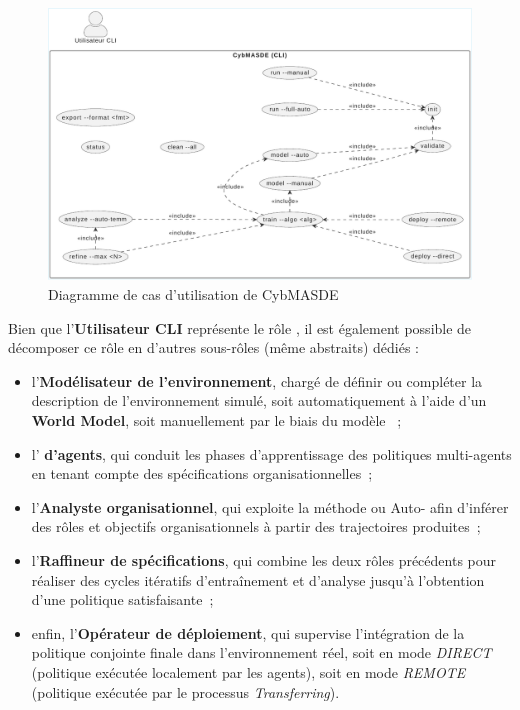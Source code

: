 \begin{figure}
  \centering
  \includegraphics[width=\linewidth]{figures/use_case_cybmasde.pdf}
  \caption{Diagramme de cas d'utilisation de CybMASDE}
  \label{fig:cybmasde_usecase}
\end{figure}

Bien que l'\textbf{Utilisateur CLI} représente le rôle , il est également possible de décomposer ce rôle en d'autres sous-rôles (même abstraits) dédiés :
\begin{itemize}
  \item l'\textbf{Modélisateur de l'environnement}, chargé de définir ou compléter la description de l'environnement simulé, soit automatiquement à l'aide d'un \textbf{World Model}, soit manuellement par le biais du modèle ~;
  \item l'\textbf{ d'agents}, qui conduit les phases d'apprentissage des politiques multi-agents en tenant compte des spécifications organisationnelles~;
  \item l'\textbf{Analyste organisationnel}, qui exploite la méthode  ou Auto- afin d'inférer des rôles et objectifs organisationnels à partir des trajectoires produites~;
  \item l'\textbf{Raffineur de spécifications}, qui combine les deux rôles précédents pour réaliser des cycles itératifs d'entraînement et d'analyse jusqu'à l'obtention d'une politique satisfaisante~;
  \item enfin, l'\textbf{Opérateur de déploiement}, qui supervise l'intégration de la politique conjointe finale dans l'environnement réel, soit en mode \textit{DIRECT} (politique exécutée localement par les agents), soit en mode \textit{REMOTE} (politique exécutée par le processus \textit{Transferring}).
\end{itemize}

